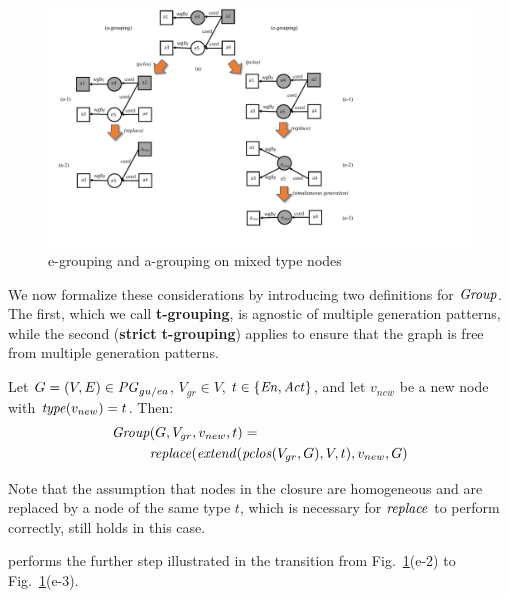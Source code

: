 \begin{figure}
\centering
\includegraphics[scale=.5]{reworked-fig9.pdf} 
\caption{e-grouping and a-grouping on mixed type nodes} \label{fig:e2-a4}
\end{figure}

We now formalize these considerations by introducing two definitions for $\mathit{Group}$. The first, which we call \textbf{t-grouping}, is agnostic of multiple generation patterns, while the second (\textbf{strict t-grouping}) applies  to ensure that the graph is free from multiple generation patterns. 

\vspace{10pt}
\begin{definition}[t-Grouping]
\label{def:t-grouping}
Let $G=(V,E) \in \mathit{PG}_{gu/ea}$, $V_{gr} \in V$, $t \in \{\mathit{En}, \mathit{Act}\}$, and let  $v_{new}$ be a new node with $\mathit{type}(v_{new}) = t$.
%
Then:
\begin{align*} 
\group & (G, V_{gr}, v_{new}, t) = \\
& \repl( \extend(\clos(V_{gr},\jwb{G}), V, t), v_{new},  G )
\end{align*}
\label{eq:t-grouping}
\end{definition}

Note that the assumption that  nodes in the closure are homogeneous and are replaced by a node of the same type $t$, which is necessary for $\mathit{replace}$ to perform correctly, still holds in this case. 

 performs the further step illustrated in the transition from Fig.~\ref{fig:e2-a4}(e-2) to Fig.~\ref{fig:e2-a4}(e-3). 



